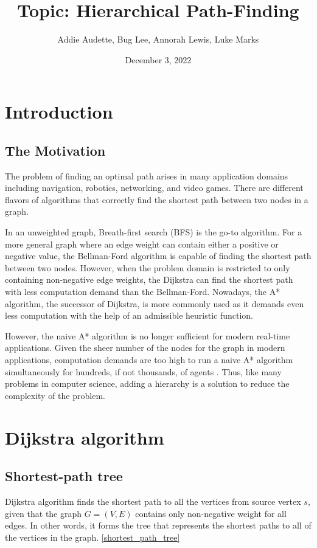 \documentclass{article}
\title{Topic: Hierarchical Path-Finding}
\author{Addie Audette, Bug Lee, Annorah Lewis, Luke Marks}
\date{December 3, 2022}
\begin{document}
\maketitle

\section{Introduction}
\subsection{The Motivation}
The problem of finding an optimal path arises in many application domains including navigation, robotics, networking, and video games. There are different flavors of algorithms that correctly find the shortest path between two nodes in a graph.  

In an unweighted graph, Breath-first search (BFS) is the go-to algorithm\cite{Erickson}. For a more general graph where an edge weight can contain either a positive or negative value, the Bellman-Ford algorithm is capable of finding the shortest path between two nodes\cite{Erickson}. However, when the problem domain is restricted to only containing non-negative edge weights, the Dijkstra can find the shortest path with less computation demand than the Bellman-Ford\cite{Erickson}. Nowadays, the A* algorithm, the successor of Dijkstra, is more commonly used as it demands even less computation with the help of an admissible heuristic function.

However, the naive A* algorithm is no longer sufficient for modern real-time applications. Given the sheer number of the nodes for the graph in modern applications, computation demands are too high to run a naive A* algorithm simultaneously for hundreds, if not thousands, of agents \cite{Botea2004NearOH}. Thus, like many problems in computer science, adding a hierarchy is a solution to reduce the complexity of the problem.

\section{Dijkstra algorithm}
\subsection{Shortest-path tree}
Dijkstra algorithm finds the shortest path to all the vertices from source vertex $s$, given that the graph $G = (V, E)$ contains only non-negative weight for all edges\cite{CLRS}. In other words, it forms the tree that represents the shortest paths to all of the vertices in the graph. 
\autoref{shortest_path_tree}
\end{document}

